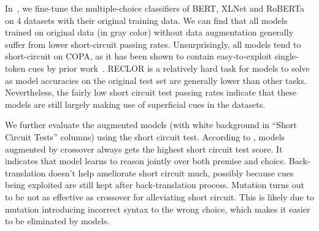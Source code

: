 In~, we fine-tune the multiple-choice classifiers of BERT, XLNet and RoBERTa on 4 datasets 
with their original training data. 
We can find that all models trained on original data (in gray color) without 
data augmentation generally suffer from lower short-circuit passing rates. 
Unsurprisingly, all models tend to short-circuit on COPA, 
as it has been shown to contain easy-to-exploit 
single-token cues by prior work~\citep{kavumba-etal-2019-choosing}. 
RECLOR is a relatively hard task for models to solve as model 
accuracies on the original test set are generally 
lower than other tasks. 
Nevertheless, the fairly low short circuit test passing rates indicate that these models are still largely making use of superficial cues in the datasets. 

We further evaluate the augmented models (with white background in 
``Short Circuit Tests'' columns) 
using the short circuit test. According to , 
models augmented by crossover always gets the highest short circuit test
score. It indicates that model learns to reason jointly over both premise and choice. 
Back-translation doesn't help ameliorate short circuit much, 
possibly because cues being exploited are still kept after back-translation process. 
Mutation turns out to be not as effective as crossover for alleviating short circuit. 
This is likely due to mutation introducing incorrect syntax to the wrong choice, 
which makes it easier to be eliminated by models.





